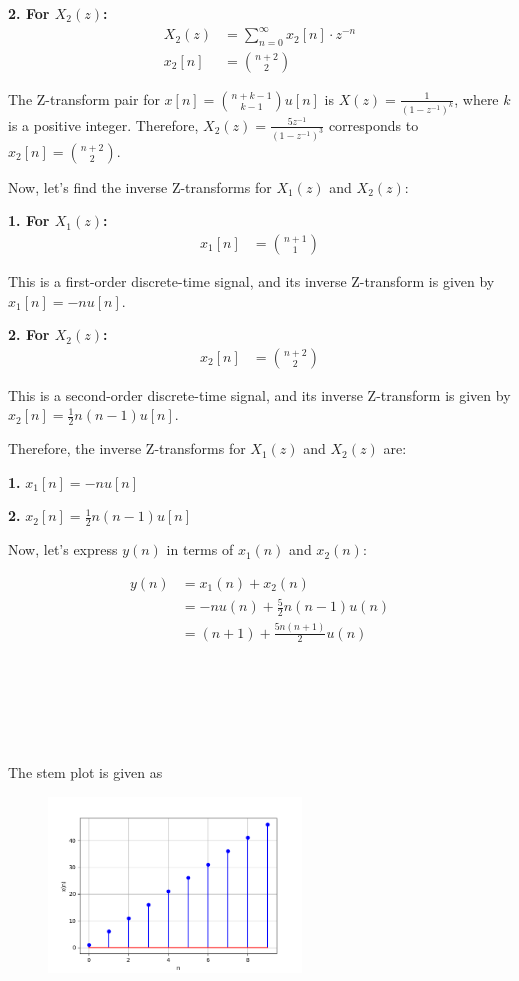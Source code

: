 \documentclass[journal,12pt,twocolumn]{IEEEtran}
\theoremstyle{remark}
\begin{document}
\textbf{2. For \(X_2(z)\):}
\begin{align}
    X_2(z) &= \sum_{n=0}^{\infty} x_2[n] \cdot z^{-n} \\
    x_2[n] &= \binom{n+2}{2}
\end{align}

The Z-transform pair for \(x[n] = \binom{n+k-1}{k-1}u[n]\) is \(X(z) = \frac{1}{{(1 - z^{-1})^k}}\), where \(k\) is a positive integer. Therefore, \(X_2(z) = \frac{5z^{-1}}{{(1 - z^{-1})^3}}\) corresponds to \(x_2[n] = \binom{n+2}{2}\).

Now, let's find the inverse Z-transforms for \(X_1(z)\) and \(X_2(z)\):

\textbf{1. For \(X_1(z)\):}
\begin{align}
    x_1[n] &= \binom{n+1}{1}
\end{align}

This is a first-order discrete-time signal, and its inverse Z-transform is given by \(x_1[n] = -nu[n]\).

\textbf{2. For \(X_2(z)\):}
\begin{align}
    x_2[n] &= \binom{n+2}{2}
\end{align}

This is a second-order discrete-time signal, and its inverse Z-transform is given by \(x_2[n] = \frac{1}{2}n(n-1)u[n]\).

Therefore, the inverse Z-transforms for \(X_1(z)\) and \(X_2(z)\) are:

\textbf{1.} \(x_1[n] = -nu[n]\)

\textbf{2.} \(x_2[n] = \frac{1}{2}n(n-1)u[n]\)

Now, let's express \(y(n)\) in terms of \(x_1(n)\) and \(x_2(n)\):

\begin{align}
    y(n) &= x_1(n) + x_2(n) \\
    &= -nu(n) + \frac{5}{2}n(n-1)u(n) \\
    &= (n+1) + \frac{5n(n+1)}{2}u(n)
\end{align}
\\\\\\
\\\\\\
The stem plot is given as

\begin{figure}[h]
  \centering
  \includegraphics[width=0.6\textwidth]{figs/stem.png}
  \label{fig:Stem_Plot}
\end{figure}
\end{document}
